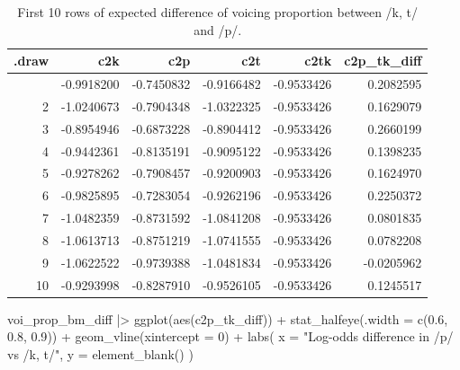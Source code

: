 \documentclass[
  authoryear,
  preprint,
  3p]{elsarticle}
\newenvironment{Shaded}{\begin{snugshade}}{\end{snugshade}}
\newcommand{\AttributeTok}[1]{\textcolor[rgb]{0.40,0.45,0.13}{#1}}
\newcommand{\DecValTok}[1]{\textcolor[rgb]{0.68,0.00,0.00}{#1}}
\newcommand{\FloatTok}[1]{\textcolor[rgb]{0.68,0.00,0.00}{#1}}
\newcommand{\FunctionTok}[1]{\textcolor[rgb]{0.28,0.35,0.67}{#1}}
\newcommand{\NormalTok}[1]{\textcolor[rgb]{0.00,0.23,0.31}{#1}}
\newcommand{\SpecialCharTok}[1]{\textcolor[rgb]{0.37,0.37,0.37}{#1}}
\newcommand{\StringTok}[1]{\textcolor[rgb]{0.13,0.47,0.30}{#1}}
\begin{document}
\begin{longtable}[]{@{}rrrrrr@{}}

\caption{\label{tbl-voi-pbd}First 10 rows of expected difference of
voicing proportion between /k, t/ and /p/.}

\tabularnewline

\toprule\noalign{}
.draw & c2k & c2p & c2t & c2tk & c2p\_tk\_diff \\
\midrule\noalign{}
\endhead
\bottomrule\noalign{}
\endlastfoot
1 & -0.9918200 & -0.7450832 & -0.9166482 & -0.9533426 & 0.2082595 \\
2 & -1.0240673 & -0.7904348 & -1.0322325 & -0.9533426 & 0.1629079 \\
3 & -0.8954946 & -0.6873228 & -0.8904412 & -0.9533426 & 0.2660199 \\
4 & -0.9442361 & -0.8135191 & -0.9095122 & -0.9533426 & 0.1398235 \\
5 & -0.9278262 & -0.7908457 & -0.9200903 & -0.9533426 & 0.1624970 \\
6 & -0.9825895 & -0.7283054 & -0.9262196 & -0.9533426 & 0.2250372 \\
7 & -1.0482359 & -0.8731592 & -1.0841208 & -0.9533426 & 0.0801835 \\
8 & -1.0613713 & -0.8751219 & -1.0741555 & -0.9533426 & 0.0782208 \\
9 & -1.0622522 & -0.9739388 & -1.0481834 & -0.9533426 & -0.0205962 \\
10 & -0.9293998 & -0.8287910 & -0.9526105 & -0.9533426 & 0.1245517 \\

\end{longtable}

\begin{Shaded}
\begin{Highlighting}[]
\NormalTok{voi\_prop\_bm\_diff }\SpecialCharTok{|\textgreater{}} 
  \FunctionTok{ggplot}\NormalTok{(}\FunctionTok{aes}\NormalTok{(c2p\_tk\_diff)) }\SpecialCharTok{+}
  \FunctionTok{stat\_halfeye}\NormalTok{(}\AttributeTok{.width =} \FunctionTok{c}\NormalTok{(}\FloatTok{0.6}\NormalTok{, }\FloatTok{0.8}\NormalTok{, }\FloatTok{0.9}\NormalTok{)) }\SpecialCharTok{+}
  \FunctionTok{geom\_vline}\NormalTok{(}\AttributeTok{xintercept =} \DecValTok{0}\NormalTok{) }\SpecialCharTok{+}
  \FunctionTok{labs}\NormalTok{(}
    \AttributeTok{x =} \StringTok{"Log{-}odds difference in /p/ vs /k, t/"}\NormalTok{,}
    \AttributeTok{y =} \FunctionTok{element\_blank}\NormalTok{()}
\NormalTok{  )}
\end{Highlighting}
\end{Shaded}
\end{document}
